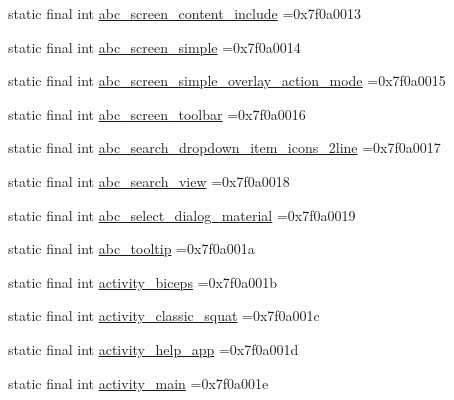 \begin{DoxyCompactItemize}
\item 
static final int \mbox{\hyperlink{classcom_1_1example_1_1trainawearapplication_1_1_r_1_1layout_a719925d701d7c8f368c793742fe1f27c}{abc\+\_\+screen\+\_\+content\+\_\+include}} =0x7f0a0013
\item 
static final int \mbox{\hyperlink{classcom_1_1example_1_1trainawearapplication_1_1_r_1_1layout_a5d304b1949a25a1fc4622784194fe9af}{abc\+\_\+screen\+\_\+simple}} =0x7f0a0014
\item 
static final int \mbox{\hyperlink{classcom_1_1example_1_1trainawearapplication_1_1_r_1_1layout_a3fac25144f3a4cccd55d53c79f6c6a81}{abc\+\_\+screen\+\_\+simple\+\_\+overlay\+\_\+action\+\_\+mode}} =0x7f0a0015
\item 
static final int \mbox{\hyperlink{classcom_1_1example_1_1trainawearapplication_1_1_r_1_1layout_a707cfe2ea68411fd70ea01a1dae6b007}{abc\+\_\+screen\+\_\+toolbar}} =0x7f0a0016
\item 
static final int \mbox{\hyperlink{classcom_1_1example_1_1trainawearapplication_1_1_r_1_1layout_a23d4cd82d35f4fd59422eb5af7359a76}{abc\+\_\+search\+\_\+dropdown\+\_\+item\+\_\+icons\+\_\+2line}} =0x7f0a0017
\item 
static final int \mbox{\hyperlink{classcom_1_1example_1_1trainawearapplication_1_1_r_1_1layout_ae59404b04947d7063de1dd0cc359f1aa}{abc\+\_\+search\+\_\+view}} =0x7f0a0018
\item 
static final int \mbox{\hyperlink{classcom_1_1example_1_1trainawearapplication_1_1_r_1_1layout_aef121cb22069f5ee9b3bb8861f726d3c}{abc\+\_\+select\+\_\+dialog\+\_\+material}} =0x7f0a0019
\item 
static final int \mbox{\hyperlink{classcom_1_1example_1_1trainawearapplication_1_1_r_1_1layout_a0ca4b1763e478cb079397b64c2e59b04}{abc\+\_\+tooltip}} =0x7f0a001a
\item 
static final int \mbox{\hyperlink{classcom_1_1example_1_1trainawearapplication_1_1_r_1_1layout_abfcfe39ab449a9e6db9f970c1fe6d3c8}{activity\+\_\+biceps}} =0x7f0a001b
\item 
static final int \mbox{\hyperlink{classcom_1_1example_1_1trainawearapplication_1_1_r_1_1layout_ab0f847c118d82ddd850b0269e18c89db}{activity\+\_\+classic\+\_\+squat}} =0x7f0a001c
\item 
static final int \mbox{\hyperlink{classcom_1_1example_1_1trainawearapplication_1_1_r_1_1layout_afec6f2f950978609d9291d236b50d9a0}{activity\+\_\+help\+\_\+app}} =0x7f0a001d
\item 
static final int \mbox{\hyperlink{classcom_1_1example_1_1trainawearapplication_1_1_r_1_1layout_a55de6effb1d44fd8f80aabde765af454}{activity\+\_\+main}} =0x7f0a001e

\end{DoxyCompactItemize}
